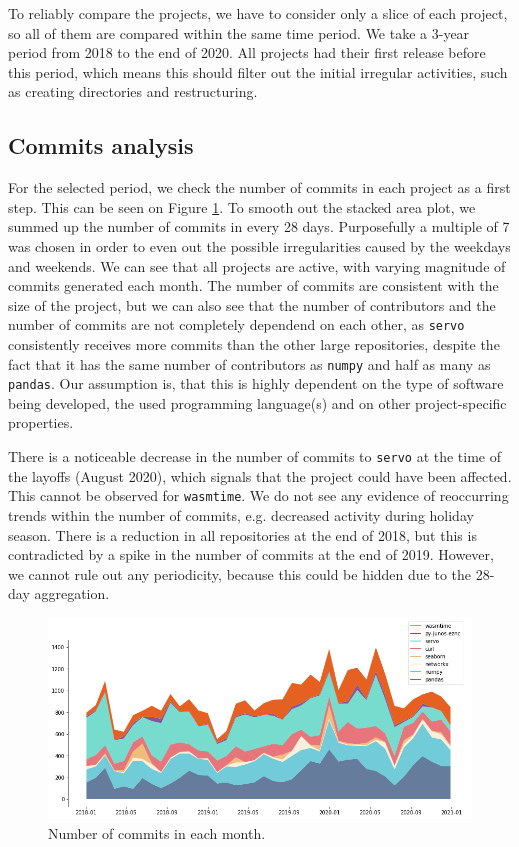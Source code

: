 To reliably compare the projects, we have to consider only a slice of each project, so all of them are compared within the same time period. We take a 3-year period from 2018 to the end of 2020. All projects had their first release before this period, which means this should filter out the initial irregular activities, such as creating directories and restructuring.

\subsection{Commits analysis}

For the selected period, we check the number of commits in each project as a first step. This can be seen on Figure \ref{fig:commits}. To smooth out the stacked area plot, we summed up the number of commits in every 28 days. Purposefully a multiple of 7 was chosen in order to even out the possible irregularities caused by the weekdays and weekends. We can see that all projects are active, with varying magnitude of commits generated each month. The number of commits are consistent with the size of the project, but we can also see that the number of contributors and the number of commits are not completely dependend on each other, as \texttt{servo} consistently receives more commits than the other large repositories, despite the fact that it has the same number of contributors as \texttt{numpy} and half as many as \texttt{pandas}. Our assumption is, that this is highly dependent on the type of software being developed, the used programming language(s) and on other project-specific properties.

There is a noticeable decrease in the number of commits to \texttt{servo} at the time of the layoffs (August 2020), which signals that the project could have been affected. This cannot be observed for \texttt{wasmtime}. We do not see any evidence of reoccurring trends within the number of commits, e.g. decreased activity during holiday season. There is a reduction in all repositories at the end of 2018, but this is contradicted by a spike in the number of commits at the end of 2019. However, we cannot rule out any periodicity, because this could be hidden due to the 28-day aggregation.

\begin{figure}
    \centering
    \includegraphics[width=\textwidth]{figures/commits.png}
    \caption{Number of commits in each month.}
    \label{fig:commits}
\end{figure}

